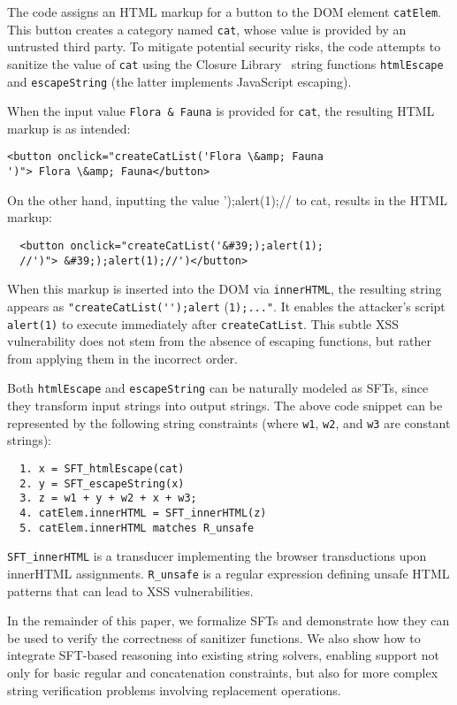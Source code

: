 The code assigns an HTML markup for a button to the DOM element \texttt{catElem}. This button creates a category named \texttt{cat}, whose value is provided by an untrusted third party. To mitigate potential security risks, the code attempts to sanitize the value of \texttt{cat} using the Closure Library~\cite{google-closure-library} string functions \texttt{htmlEscape} and \texttt{escapeString} (the latter implements JavaScript escaping). 

When the input value \texttt{Flora \& Fauna} is provided for \texttt{cat}, the resulting HTML markup is as intended:
\begin{verbatim}
<button onclick="createCatList('Flora \&amp; Fauna
')"> Flora \&amp; Fauna</button>
\end{verbatim}
On the other hand, inputting the value ');alert(1);// to cat,
results in the HTML markup:
\begin{verbatim}
  <button onclick="createCatList('&#39;);alert(1);
  //')"> &#39;);alert(1);//')</button>
\end{verbatim}

When this markup is inserted into the DOM via \texttt{innerHTML}, 
the resulting string appears as \verb|"createCatList('');alert| (\verb|1);..."|. It enables the attacker's script \texttt{alert(1)} to execute immediately after \texttt{createCatList}. 
This subtle XSS vulnerability does not stem from the absence of escaping functions, but rather from applying them in the incorrect order.

Both \texttt{htmlEscape} and \texttt{escapeString} can be naturally modeled as SFTs, since they transform input strings into output strings. The above code snippet can be represented by the following string constraints (where \texttt{w1},
\texttt{w2}, and \texttt{w3} are constant strings):

\begin{verbatim}
  1. x = SFT_htmlEscape(cat)
  2. y = SFT_escapeString(x)
  3. z = w1 + y + w2 + x + w3;
  4. catElem.innerHTML = SFT_innerHTML(z)
  5. catElem.innerHTML matches R_unsafe
\end{verbatim}
\texttt{SFT\_innerHTML} is a transducer implementing the browser transductions upon innerHTML
assignments. \texttt{R\_unsafe} is a regular expression defining unsafe HTML patterns that can lead to XSS vulnerabilities.

In the remainder of this paper, we formalize SFTs and demonstrate how they can be used to verify the correctness of sanitizer functions. We also show how to integrate SFT-based reasoning into existing string solvers, enabling support not only for basic regular and concatenation constraints, but also for more complex string verification problems involving replacement operations.





